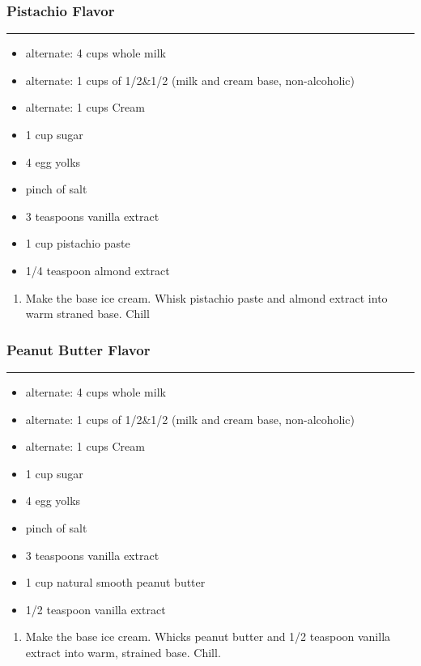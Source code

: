 \documentclass{article}
\begin{document}
\subsubsection{Pistachio Flavor}
\noindent\rule[0.5ex]{\linewidth}{0.5pt}
\begin{framed}
    \begin{itemize}
        \item alternate: 4 cups whole milk
        \item alternate: 1 cups of 1/2\&1/2 (milk and cream base, non-alcoholic)
        \item alternate: 1 cups Cream
        \item 1 cup sugar
        \item 4 egg yolks
        \item pinch of salt
        \item 3 teaspoons vanilla extract
        \item 1 cup pistachio paste 
        \item 1/4 teaspoon almond extract
    \end{itemize}
\end{framed}
\begin{enumerate}
    \item 
        Make the base ice cream. Whisk pistachio paste and almond extract into warm straned base. Chill
\end{enumerate}

\subsubsection{Peanut Butter Flavor}
\noindent\rule[0.5ex]{\linewidth}{0.5pt}
\begin{framed}
    \begin{itemize} 
        \item alternate: 4 cups whole milk
        \item alternate: 1 cups of 1/2\&1/2 (milk and cream base, non-alcoholic)
        \item alternate: 1 cups Cream
        \item 1 cup sugar
        \item 4 egg yolks
        \item pinch of salt
        \item 3 teaspoons vanilla extract
        \item 1 cup natural smooth peanut butter 
        \item 1/2 teaspoon vanilla extract
    \end{itemize}
\end{framed}
\begin{enumerate}
    \item 
        Make the base ice cream. Whicks peanut butter and 1/2 teaspoon vanilla extract into warm, strained base. Chill.
\end{enumerate}
\end{document}
